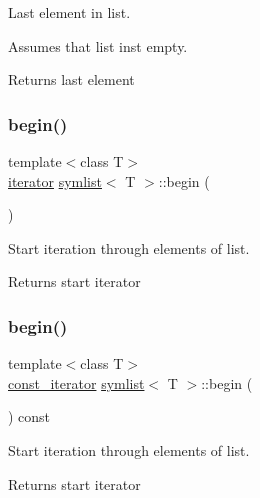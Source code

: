 Last element in list. 

Assumes that list ins\textquotesingle{}t empty.

\begin{DoxyReturn}{Returns}
last element 
\end{DoxyReturn}
\mbox{\label{classsymlist_a525b8d44af5d771fe15916372515cce0}} 
\subsubsection{\texorpdfstring{begin()}{begin()}\hspace{0.1cm}{\footnotesize\ttfamily [1/2]}}
{\footnotesize\ttfamily template$<$class T$>$ \\
\mbox{\hyperlink{structsymlist__iterator}{iterator}} \mbox{\hyperlink{classsymlist}{symlist}}$<$ T $>$\+::begin (\begin{DoxyParamCaption}{ }\end{DoxyParamCaption})\hspace{0.3cm}{\ttfamily [inline]}}



Start iteration through elements of list. 

\begin{DoxyReturn}{Returns}
start iterator 
\end{DoxyReturn}
\mbox{\label{classsymlist_a843d2df09f34079f6547f338b50823cd}} 
\subsubsection{\texorpdfstring{begin()}{begin()}\hspace{0.1cm}{\footnotesize\ttfamily [2/2]}}
{\footnotesize\ttfamily template$<$class T$>$ \\
\mbox{\hyperlink{structsymlist__iterator}{const\+\_\+iterator}} \mbox{\hyperlink{classsymlist}{symlist}}$<$ T $>$\+::begin (\begin{DoxyParamCaption}{ }\end{DoxyParamCaption}) const\hspace{0.3cm}{\ttfamily [inline]}}



Start iteration through elements of list. 

\begin{DoxyReturn}{Returns}
start iterator 
\end{DoxyReturn}
\mbox{\label{classsymlist_aca11cd6c621376bc52a18828ef92e753}} 

